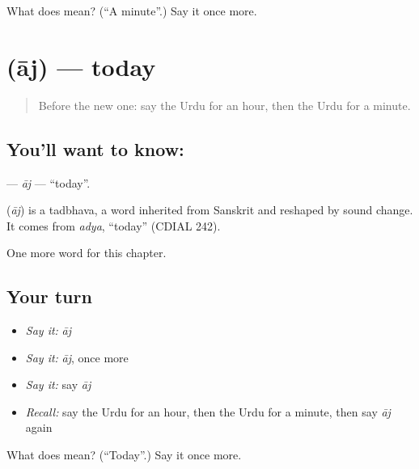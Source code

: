\begin{tcolorbox}[breakable,colback=teal!4,colframe=teal!35!black,title={Before you move on}]
What does  mean? (\textquotedblleft{}A minute\textquotedblright{}.) Say it once more.
\end{tcolorbox}
\section[\texorpdfstring{\ur{آج} (āj)}{آج (āj)}]{ (āj) — today}

\label{lesson:UR-C76-aj}



\begin{quote}
Before the new one: say the Urdu for an hour, then the Urdu for a minute.
\end{quote}

\subsection*{You'll want to know: }
\textbf{} — \emph{āj} — \textquotedblleft{}today\textquotedblright{}.

\begin{cousinweb}
\textbf{} (\emph{āj}) is a tadbhava, a word inherited from Sanskrit and reshaped by sound change. It comes from \emph{adya}, \textquotedblleft{}today\textquotedblright{} (CDIAL 242).
\end{cousinweb}

\begin{grammarlens}[title={What you've built}]
One more word for this chapter.
\end{grammarlens}

\subsection*{Your turn}
\begin{itemize}
\raggedright
  \item \emph{Say it:} \emph{āj}
  \item \emph{Say it:} \emph{āj}, once more
  \item \emph{Say it:} say \emph{āj}
  \item \emph{Recall:} say the Urdu for an hour, then the Urdu for a minute, then say \emph{āj} again
\end{itemize}

\begin{tcolorbox}[breakable,colback=teal!4,colframe=teal!35!black,title={Before you move on}]
What does  mean? (\textquotedblleft{}Today\textquotedblright{}.) Say it once more.
\end{tcolorbox}
